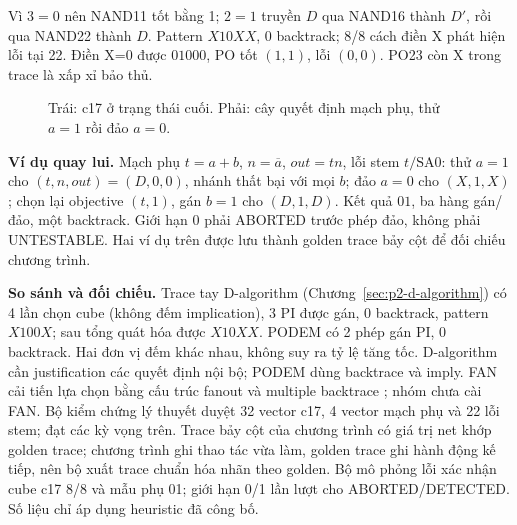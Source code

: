 Vì $3=0$ nên NAND11 tốt bằng 1; $2=1$ truyền $D$ qua NAND16 thành
$D'$, rồi qua NAND22 thành $D$. Pattern $X10XX$, 0 backtrack;
8/8 cách điền X phát hiện lỗi tại 22. Điền X=0 được $01000$,
PO tốt $(1,1)$, lỗi $(0,0)$. PO23 còn X trong trace là xấp xỉ bảo thủ.

\begin{figure}[htbp]\centering
\begin{minipage}{0.49\linewidth}\centering
{}
\end{minipage}\hfill
\begin{minipage}{0.49\linewidth}\centering
\resizebox{\linewidth}{!}{}
\end{minipage}
\caption{Trái: c17 ở trạng thái cuối.
Phải: cây quyết định mạch phụ, thử $a=1$ rồi đảo $a=0$.}
\label{fig:p3-examples}
\end{figure}

\textbf{Ví dụ quay lui.}
Mạch phụ $t=a+b$, $n=\overline a$, $out=tn$, lỗi stem $t/\mathrm{SA0}$:
thử $a=1$ cho $(t,n,out)=(D,0,0)$, nhánh thất bại với mọi $b$;
đảo $a=0$ cho $(X,1,X)$; chọn lại objective $(t,1)$, gán $b=1$
cho $(D,1,D)$. Kết quả $01$, ba hàng gán/đảo, một backtrack.
Giới hạn 0 phải ABORTED trước phép đảo, không phải UNTESTABLE.
Hai ví dụ trên được lưu thành golden trace bảy cột để đối chiếu chương trình.

\textbf{So sánh và đối chiếu.}
Trace tay D-algorithm (Chương~\ref{sec:p2-d-algorithm}) có 4 lần chọn cube
(không đếm implication), 3 PI được gán, 0 backtrack, pattern $X100X$;
sau tổng quát hóa được $X10XX$. PODEM có 2 phép gán PI, 0 backtrack.
Hai đơn vị đếm khác nhau, không suy ra tỷ lệ tăng tốc.
D-algorithm cần justification các quyết định nội bộ; PODEM dùng backtrace
và imply. FAN cải tiến lựa chọn bằng cấu trúc fanout và multiple backtrace
\cite{p3_fujiwara1983}; nhóm chưa cài FAN.
Bộ kiểm chứng lý thuyết duyệt 32 vector c17, 4 vector mạch phụ và 22 lỗi
stem; đạt các kỳ vọng trên. Trace bảy cột của chương trình có giá trị net
khớp golden trace; chương trình ghi thao tác vừa làm, golden trace ghi hành
động kế tiếp, nên bộ xuất trace chuẩn hóa nhãn theo golden.
Bộ mô phỏng lỗi xác nhận cube c17 8/8 và mẫu phụ 01; giới hạn 0/1 lần lượt
cho ABORTED/DETECTED. Số liệu chỉ áp dụng heuristic đã công bố.
